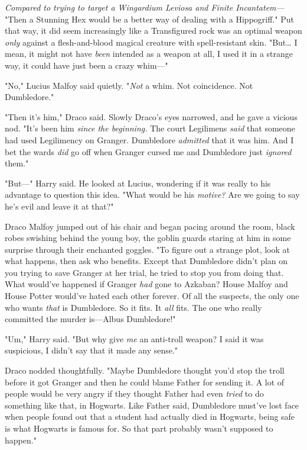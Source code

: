 \emph{Compared to trying to target a Wingardium Leviosa and Finite
Incantatem---} "Then a Stunning Hex would be a better way of dealing with a
Hippogriff." Put that way, it did seem increasingly like a Transfigured rock
was an optimal weapon \emph{only} against a flesh-and-blood magical creature
with spell-resistant skin. "But{\ldots} I mean, it might not have \emph{been}
intended as a weapon at all, I used it in a strange way, it could have just
been a crazy whim---"

"No," Lucius Malfoy said quietly. "\emph{Not} a whim. Not coincidence. Not
Dumbledore."

"Then it's him," Draco said. Slowly Draco's eyes narrowed, and he gave a
vicious nod. "It's been him \emph{since the beginning.} The court Legilimens
\emph{said} that someone had used Legilimency on Granger. Dumbledore
\emph{admitted} that it was him. And I bet the wards \emph{did} go off when
Granger cursed me and Dumbledore just \emph{ignored} them."

"But---" Harry said. He looked at Lucius, wondering if it was really to his
advantage to question this idea. "What would be his \emph{motive?} Are we going
to say he's evil and leave it at that?"

Draco Malfoy jumped out of his chair and began pacing around the room, black
robes swishing behind the young boy, the goblin guards staring at him in some
surprise through their enchanted goggles. "To figure out a strange plot, look
at what happens, then ask who benefits. Except that Dumbledore didn't plan on
you trying to save Granger at her trial, he tried to stop you from doing that.
What would've happened if Granger \emph{had} gone to Azkaban? House Malfoy and
House Potter would've hated each other forever. Of all the suspects, the only
one who wants \emph{that} is Dumbledore. So it fits. It \emph{all} fits. The
one who really committed the murder is---Albus Dumbledore!"

"Um," Harry said. "But why give \emph{me} an anti-troll weapon? I said it was
suspicious, I didn't say that it made any sense."

Draco nodded thoughtfully. "Maybe Dumbledore thought you'd stop the troll
before it got Granger and then he could blame Father for sending it. A lot of
people would be very angry if they thought Father had even \emph{tried} to do
something like that, in Hogwarts. Like Father said, Dumbledore must've lost
face when people found out that a student had actually died in Hogwarts, being
safe is what Hogwarts is famous for. So that part probably wasn't supposed to
happen."


